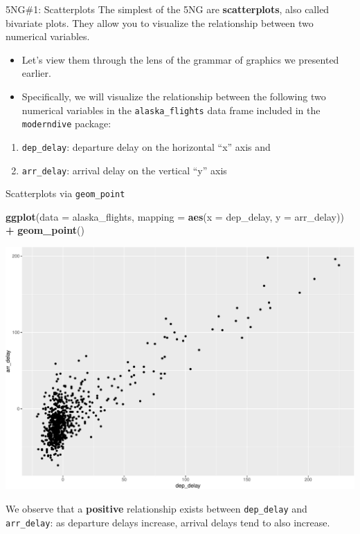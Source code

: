\documentclass[
  ignorenonframetext,
]{beamer}
\newenvironment{Shaded}{\begin{snugshade}}{\end{snugshade}}
\newcommand{\AttributeTok}[1]{\textcolor[rgb]{0.13,0.29,0.53}{#1}}
\newcommand{\FunctionTok}[1]{\textcolor[rgb]{0.13,0.29,0.53}{\textbf{#1}}}
\newcommand{\NormalTok}[1]{#1}
\newcommand{\SpecialCharTok}[1]{\textcolor[rgb]{0.81,0.36,0.00}{\textbf{#1}}}
\begin{document}
\begin{frame}[fragile]{5NG\#1: Scatterplots}
\protect\hypertarget{ng1-scatterplots}{}
The simplest of the 5NG are \textbf{scatterplots}, also called bivariate
plots. They allow you to visualize the relationship between two
numerical variables.

\begin{itemize}
\item
  Let's view them through the lens of the grammar of graphics we
  presented earlier.
\item
  Specifically, we will visualize the relationship between the following
  two numerical variables in the \texttt{alaska\_flights} data frame
  included in the \texttt{moderndive} package:
\end{itemize}

\begin{enumerate}
\item
  \texttt{dep\_delay}: departure delay on the horizontal ``x'' axis and
\item
  \texttt{arr\_delay}: arrival delay on the vertical ``y'' axis
\end{enumerate}
\end{frame}

\begin{frame}[fragile]{Scatterplots via \texttt{geom\_point}}
\protect\hypertarget{scatterplots-via-geom_point}{}
\tiny

\begin{Shaded}
\begin{Highlighting}[]
\FunctionTok{ggplot}\NormalTok{(}\AttributeTok{data =}\NormalTok{ alaska\_flights, }\AttributeTok{mapping =} \FunctionTok{aes}\NormalTok{(}\AttributeTok{x =}\NormalTok{ dep\_delay, }\AttributeTok{y =}\NormalTok{ arr\_delay)) }\SpecialCharTok{+} 
  \FunctionTok{geom\_point}\NormalTok{()}
\end{Highlighting}
\end{Shaded}

\begin{center}\includegraphics[width=0.7\linewidth,height=0.5\textheight]{Week2_files/figure-beamer/unnamed-chunk-20-1} \end{center}
\normalsize

We observe that a \textbf{positive} relationship exists between
\texttt{dep\_delay} and \texttt{arr\_delay}: as departure delays
increase, arrival delays tend to also increase.
\end{frame}
\end{document}
